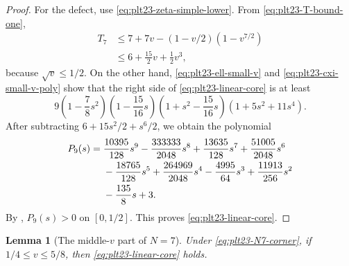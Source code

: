 \documentclass[11pt]{article}
\newtheorem{lemma}[theorem]{Lemma}
\numberwithin{equation}{section}
\begin{document}
\begin{proof}
  For the defect, use \eqref{eq:plt23-zeta-simple-lower}.  From
  \eqref{eq:plt23-T-bound-one},
  \begin{align*}
    T_7
    &\le7+7v-(1-v/2)(1-v^{7/2})\\
    &\le6+\frac{15}{2}v+\frac{1}{2}v^3,
  \end{align*}
  because $\sqrt v\le1/2$.  On the other hand,
  \eqref{eq:plt23-ell-small-v} and \eqref{eq:plt23-cxi-small-v-poly} show that the right
  side of \eqref{eq:plt23-linear-core} is at least
  \[
    9\left(1-\frac{7}{8}s^2\right)
    \left(1-\frac{15}{16}s\right)
    \left(1+s^2-\frac{15}{16}s\right)
    (1+5s^2+11s^4).
  \]
  After subtracting $6+15s^2/2+s^6/2$, we obtain the polynomial
  \begin{align}
    P_9(s)={}&\frac{10395}{128}s^9-\frac{333333}{2048}s^8
    +\frac{13635}{128}s^7+\frac{51005}{2048}s^6 \notag\\
    &-\frac{18765}{128}s^5+\frac{264969}{2048}s^4
    -\frac{4995}{64}s^3+\frac{11913}{256}s^2 \notag\\
    &-\frac{135}{8}s+3. \label{eq:plt23-P9-small}
  \end{align}
  By , $P_9(s)>0$ on $[0,1/2]$.  This proves
  \eqref{eq:plt23-linear-core}.
\end{proof}

\begin{lemma}[The middle-$v$ part of $N=7$]\label{lem:plt23-N7-middle-v}
  Under \eqref{eq:plt23-N7-corner}, if $1/4\le v\le5/8$, then
  \eqref{eq:plt23-linear-core} holds.
\end{lemma}
\end{document}
